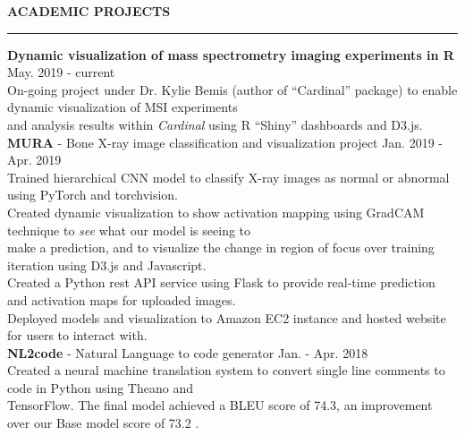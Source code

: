 \documentclass[a4paper]{article}
\newcommand{\myline}{\par
  \kern2pt %
  \hrule height 0.5pt
  \kern2pt %
}
\newcommand{\mybullet}{
	\indent \textbullet \hspace*{2mm}
}
\newcommand{\linetab}{
  \\ \hspace*{9mm}
}
\begin{document}
	
\noindent
{\large \textbf{ACADEMIC PROJECTS}}
\myline 
\smallskip

      \noindent
      \textbf{Dynamic visualization of mass spectrometry imaging experiments in R}
      \hfill May. 2019 - current \\
      \mybullet On-going project under Dr. Kylie Bemis (author of ``Cardinal'' package) to enable 
      dynamic visualization of MSI experiments \linetab and analysis results within 
      \textit{Cardinal} using R ``Shiny'' dashboards and D3.js. \\

      \noindent
      \textbf{MURA} - Bone X-ray image classification and visualization project 
      \hfill Jan. 2019 - Apr. 2019 \\
      \mybullet Trained hierarchical CNN model to classify X-ray images as normal or abnormal 
      using PyTorch and torchvision. \\
      \mybullet Created dynamic visualization to show activation mapping using GradCAM technique 
      to \textit{see} what our model is seeing to \linetab make a prediction, and to visualize the 
      change in region of focus over training iteration using D3.js and Javascript. \\
      \mybullet Created a Python rest API service using Flask to provide real-time prediction and 
      activation maps for uploaded images. \\
      \mybullet Deployed models and visualization to Amazon EC2 instance and hosted website for 
      users to interact with. \\

			\noindent
			\textbf{NL2code} - Natural Language to code generator
			\hfill Jan. - Apr. 2018 \\
			\mybullet Created a neural machine translation system to convert single line comments 
			to code in Python using Theano and \\ 
			\hspace*{9mm} TensorFlow. The final model achieved a BLEU score of 74.3, an improvement 
			over our Base model score of 73.2 . \\
\end{document}
